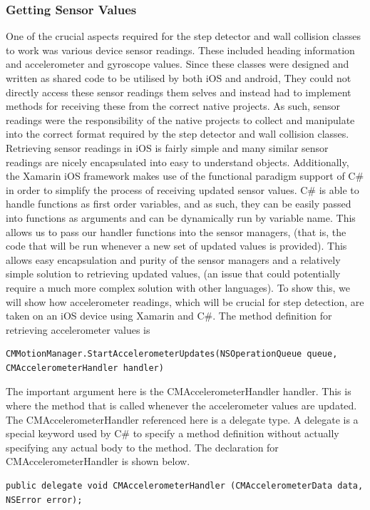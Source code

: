 \documentclass[main.tex]{subfiles}
\begin{document}
\subsubsection{Getting Sensor Values}
One of the crucial aspects required for the step detector and wall collision classes to work was various device sensor readings. These included heading information and accelerometer and gyroscope values. Since these classes were designed and written as shared code to be utilised by both iOS and android, They could not directly access these sensor readings them selves and instead had to implement methods for receiving these from the correct native projects. As such, sensor readings were the responsibility of the native projects to collect and manipulate into the correct format required by the step detector and wall collision classes. Retrieving sensor readings in iOS is fairly simple and many similar sensor readings are nicely encapsulated into easy to understand objects. Additionally, the Xamarin iOS framework makes use of the functional paradigm support of C# in order to simplify the process of receiving updated sensor values. C# is able to handle functions as first order variables, and as such, they can be easily passed into functions as arguments and can be dynamically run by variable name. This allows us to pass our handler functions into the sensor managers, (that is, the code that will be run whenever a new set of updated values is provided). This allows easy encapsulation and purity of the sensor managers and a relatively simple solution to retrieving updated values, (an issue that could potentially require a much more complex solution with other languages). To show this, we will show how accelerometer readings, which will be crucial for step detection, are taken on an iOS device using Xamarin and C#. The method definition for retrieving accelerometer values is 
\begin{lstlisting}
CMMotionManager.StartAccelerometerUpdates(NSOperationQueue queue, CMAccelerometerHandler handler)
\end{lstlisting}
The important argument here is the CMAccelerometerHandler handler. This is where the method that is called whenever the accelerometer values are updated. The CMAccelerometerHandler referenced here is a delegate type. A delegate is a special keyword used by C# to specify a method definition without actually specifying any actual body to the method. The declaration for CMAccelerometerHandler is shown below.
\begin{lstlisting}
public delegate void CMAccelerometerHandler (CMAccelerometerData data, NSError error);
\end{lstlisting}
\end{document}
